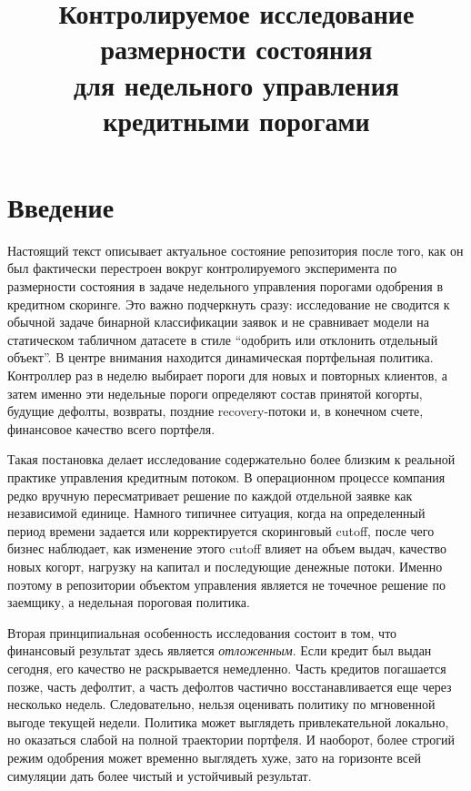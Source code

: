 \documentclass[12pt,a4paper]{article}
\title{Контролируемое исследование размерности состояния\\для недельного управления кредитными порогами}
\author{}
\date{}
\begin{document}

\maketitle
\tableofcontents
\clearpage

\section{Введение}

Настоящий текст описывает актуальное состояние репозитория после того, как он был фактически перестроен вокруг контролируемого эксперимента по размерности состояния в задаче недельного управления порогами одобрения в кредитном скоринге. Это важно подчеркнуть сразу: исследование не сводится к обычной задаче бинарной классификации заявок и не сравнивает модели на статическом табличном датасете в стиле ``одобрить или отклонить отдельный объект''. В центре внимания находится динамическая портфельная политика. Контроллер раз в неделю выбирает пороги для новых и повторных клиентов, а затем именно эти недельные пороги определяют состав принятой когорты, будущие дефолты, возвраты, поздние recovery-потоки и, в конечном счете, финансовое качество всего портфеля.

Такая постановка делает исследование содержательно более близким к реальной практике управления кредитным потоком. В операционном процессе компания редко вручную пересматривает решение по каждой отдельной заявке как независимой единице. Намного типичнее ситуация, когда на определенный период времени задается или корректируется скоринговый cutoff, после чего бизнес наблюдает, как изменение этого cutoff влияет на объем выдач, качество новых когорт, нагрузку на капитал и последующие денежные потоки. Именно поэтому в репозитории объектом управления является не точечное решение по заемщику, а недельная пороговая политика.

Вторая принципиальная особенность исследования состоит в том, что финансовый результат здесь является \emph{отложенным}. Если кредит был выдан сегодня, его качество не раскрывается немедленно. Часть кредитов погашается позже, часть дефолтит, а часть дефолтов частично восстанавливается еще через несколько недель. Следовательно, нельзя оценивать политику по мгновенной выгоде текущей недели. Политика может выглядеть привлекательной локально, но оказаться слабой на полной траектории портфеля. И наоборот, более строгий режим одобрения может временно выглядеть хуже, зато на горизонте всей симуляции дать более чистый и устойчивый результат.
\end{document}
